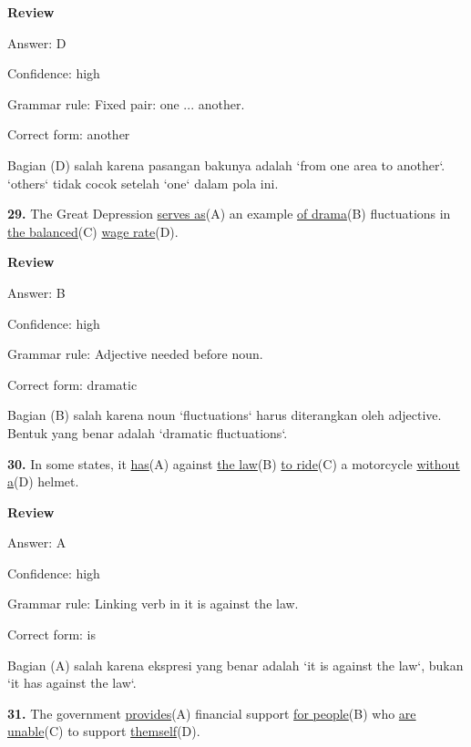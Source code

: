 \documentclass[12pt]{article}
\begin{document}
\setlength{\parindent}{0pt}
\textbf{Review}\par
Answer: D\par
Confidence: high\par
Grammar rule: Fixed pair: one ... another.\par
Correct form: another\par
Bagian (D) salah karena pasangan bakunya adalah `from one area to another`. `others` tidak cocok setelah `one` dalam pola ini.\par
\endgroup
\par
\vspace{\questionblockgap}
\noindent\textbf{29.} The Great Depression \uline{serves as}(A) an example \uline{of drama}(B) fluctuations in \uline{the balanced}(C) \uline{wage rate}(D).
\par
\begingroup
\setlength{\parskip}{0pt}
\setlength{\parindent}{0pt}
\textbf{Review}\par
Answer: B\par
Confidence: high\par
Grammar rule: Adjective needed before noun.\par
Correct form: dramatic\par
Bagian (B) salah karena noun `fluctuations` harus diterangkan oleh adjective. Bentuk yang benar adalah `dramatic fluctuations`.\par
\endgroup
\par
\vspace{\questionblockgap}
\noindent\textbf{30.} In some states, it \uline{has}(A) against \uline{the law}(B) \uline{to ride}(C) a motorcycle \uline{without a}(D) helmet.
\par
\begingroup
\setlength{\parskip}{0pt}
\setlength{\parindent}{0pt}
\textbf{Review}\par
Answer: A\par
Confidence: high\par
Grammar rule: Linking verb in it is against the law.\par
Correct form: is\par
Bagian (A) salah karena ekspresi yang benar adalah `it is against the law`, bukan `it has against the law`.\par
\endgroup
\par
\vspace{\questionblockgap}
\noindent\textbf{31.} The government \uline{provides}(A) financial support \uline{for people}(B) who \uline{are unable}(C) to support \uline{themself}(D).
\par
\end{document}
